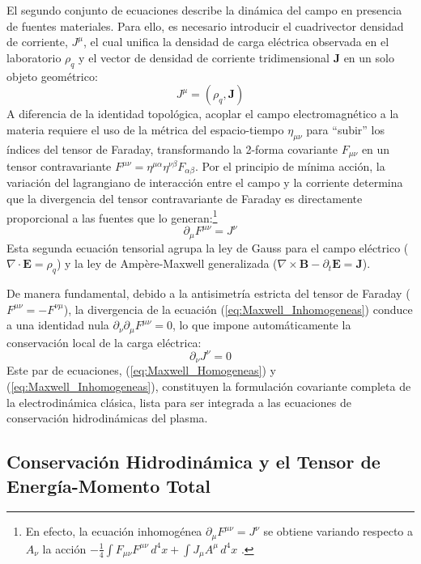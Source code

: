 \primerparrafo El segundo conjunto de ecuaciones describe la dinámica del campo en presencia de fuentes materiales. Para ello, es necesario introducir el cuadrivector densidad de corriente, $J^\mu$, el cual unifica la densidad de carga eléctrica observada en el laboratorio $\rho_q$ y el vector de densidad de corriente tridimensional $\mathbf{J}$ en un solo objeto geométrico:
\begin{equation}
    J^\mu = (\rho_q, \mathbf{J})
\end{equation}
A diferencia de la identidad topológica, acoplar el campo electromagnético a la materia requiere el uso de la métrica del espacio-tiempo $\eta_{\mu\nu}$ para ``subir'' los índices del tensor de Faraday, transformando la 2-forma covariante $F_{\mu\nu}$ en un tensor contravariante $F^{\mu\nu} = \eta^{\mu\alpha} \eta^{\nu\beta} F_{\alpha\beta}$. Por el principio de mínima acción, la variación del lagrangiano de interacción entre el campo y la corriente determina que la divergencia del tensor contravariante de Faraday es directamente proporcional a las fuentes que lo generan:\footnote{En efecto, la ecuación inhomogénea $\partial_\mu F^{\mu\nu}=J^\nu$ se obtiene variando respecto a $A_\nu$ la acción $-\tfrac14\int F_{\mu\nu}F^{\mu\nu}\,d^4x+\int J_\mu A^\mu\,d^4x$ \parencite{baez-muniain-1994}.}
\begin{equation}
\label{eq:Maxwell_Inhomogeneas}
    \partial_\mu F^{\mu\nu} = J^\nu
\end{equation}
Esta segunda ecuación tensorial agrupa la ley de Gauss para el campo eléctrico ($\nabla \cdot \mathbf{E} = \rho_q$) y la ley de Ampère-Maxwell generalizada ($\nabla \times \mathbf{B} - \partial_t \mathbf{E} = \mathbf{J}$). 

De manera fundamental, debido a la antisimetría estricta del tensor de Faraday ($F^{\mu\nu} = -F^{\nu\mu}$), la divergencia de la ecuación (\ref{eq:Maxwell_Inhomogeneas}) conduce a una identidad nula $\partial_\nu \partial_\mu F^{\mu\nu} = 0$, lo que impone automáticamente la conservación local de la carga eléctrica:
\begin{equation}
    \partial_\nu J^\nu = 0
\end{equation}
Este par de ecuaciones, (\ref{eq:Maxwell_Homogeneas}) y (\ref{eq:Maxwell_Inhomogeneas}), constituyen la formulación covariante completa de la electrodinámica clásica, lista para ser integrada a las ecuaciones de conservación hidrodinámicas del plasma.

\subsection{Conservación Hidrodinámica y el Tensor de Energía-Momento Total}
\label{sec:Energia_Momento}

